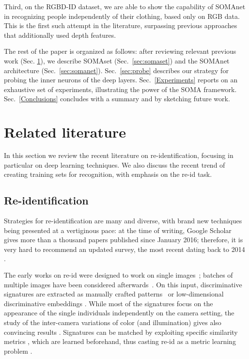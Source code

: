\documentclass[10pt,journal,letterpaper,compsoc]{IEEEtran}
\begin{document}
Third, on the RGBD-ID dataset, we are able to show the capability of SOMAnet in recognizing people independently of their clothing, based only on RGB data. This is the first such attempt in the literature, surpassing previous approaches that additionally used depth features. 



The rest of the paper is organized as follows: after reviewing relevant previous work (Sec. \ref{rel-work}), we describe SOMAset (Sec.~\ref{sec:somaset}) and the SOMAnet architecture (Sec.~\ref{sec:somanet}). Sec.~\ref{sec:probe} describes our strategy for probing the inner neurons of the deep layers. Sec.~\ref{Experiments} reports on an exhaustive set of experiments, illustrating the power of the SOMA framework.
Sec.~\ref{Conclusions} concludes with a summary and by sketching future work.

\section{Related literature}
\label{rel-work}

In this section we review the recent literature on  re-identification, focusing in particular on deep learning techniques.  We also discuss the recent trend of creating training sets for recognition, with emphasis on the re-id task.

\subsection{Re-identification}
Strategies for re-identification are many and diverse, with brand new techniques being presented at a vertiginous pace: at the time of writing, Google Scholar gives more than a thousand papers published since January 2016; therefore, it is very hard to recommend an updated survey,  the most recent dating back to 2014 \cite{bedagkar2014survey}.


The early works on re-id were designed to work on single images~\cite{gray2008viewpoint}; batches of multiple images  have been considered afterwards~\cite{farenzena2010person}.
On this input, discriminative signatures are extracted as manually crafted patterns~\cite{farenzena2010person} or
low-dimensional discriminative embeddings \cite{xiong2014person}. While most of the signatures focus on the appearance of the single individuals independently on the camera setting, the study of the inter-camera variations of color (and illumination) gives also convincing results \cite{Martinel_TPAMI,Das2014,Zhang_2015_ICCV,Chakraborty_TPAMI}. Signatures can be matched by exploiting specific similarity metrics \cite{bkak2014re}, which are learned beforehand, thus casting re-id as a metric learning problem \cite{KISSME,Liao_2015_CVPR,Liao_2015_ICCV,Chen_2016_CVPR,Zhang_2016_CVPR}.
\end{document}
